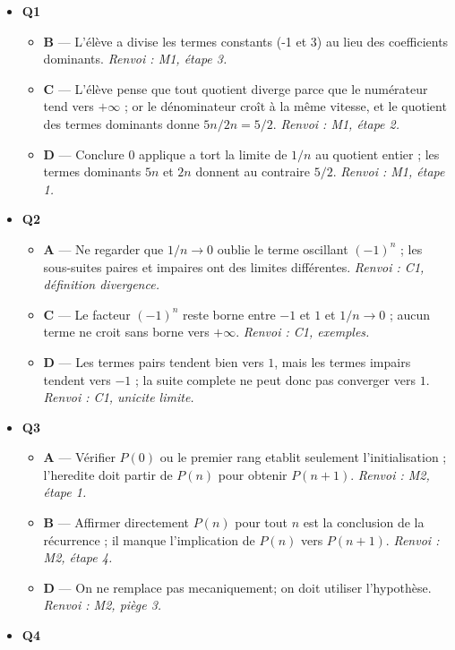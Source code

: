 \begin{itemize}
  \item \textbf{Q1}
  \begin{itemize}
    \item \textbf{B} — L'élève a divise les termes constants (-1 et 3) au lieu des coefficients dominants. \emph{Renvoi : M1, étape 3.}
    \item \textbf{C} — L'élève pense que tout quotient diverge parce que le numérateur tend vers $+\infty$ ; or le dénominateur croît à la même vitesse, et le quotient des termes dominants donne $5n/2n = 5/2$. \emph{Renvoi : M1, étape 2.}
    \item \textbf{D} — Conclure $0$ applique a tort la limite de $1/n$ au quotient entier ; les termes dominants $5n$ et $2n$ donnent au contraire $5/2$. \emph{Renvoi : M1, étape 1.}
  \end{itemize}
  \item \textbf{Q2}
  \begin{itemize}
    \item \textbf{A} — Ne regarder que $1/n\to0$ oublie le terme oscillant $(-1)^n$ ; les sous-suites paires et impaires ont des limites différentes. \emph{Renvoi : C1, définition divergence.}
    \item \textbf{C} — Le facteur $(-1)^n$ reste borne entre $-1$ et $1$ et $1/n\to0$ ; aucun terme ne croit sans borne vers $+\infty$. \emph{Renvoi : C1, exemples.}
    \item \textbf{D} — Les termes pairs tendent bien vers $1$, mais les termes impairs tendent vers $-1$ ; la suite complete ne peut donc pas converger vers $1$. \emph{Renvoi : C1, unicite limite.}
  \end{itemize}
  \item \textbf{Q3}
  \begin{itemize}
    \item \textbf{A} — Vérifier $P(0)$ ou le premier rang etablit seulement l'initialisation ; l'heredite doit partir de $P(n)$ pour obtenir $P(n+1)$. \emph{Renvoi : M2, étape 1.}
    \item \textbf{B} — Affirmer directement $P(n)$ pour tout $n$ est la conclusion de la récurrence ; il manque l'implication de $P(n)$ vers $P(n+1)$. \emph{Renvoi : M2, étape 4.}
    \item \textbf{D} — On ne remplace pas mecaniquement; on doit utiliser l'hypothèse. \emph{Renvoi : M2, piège 3.}
  \end{itemize}
  \item \textbf{Q4}
  \begin{itemize}

\end{itemize}
\end{itemize}
